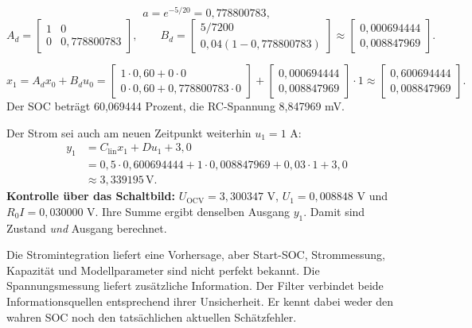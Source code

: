 \[
a=e^{-5/20}=0{,}778800783,
\]
\[
A_d=\begin{bmatrix}1&0\\0&0{,}778800783\end{bmatrix},\qquad
B_d=\begin{bmatrix}5/7200\\0{,}04(1-0{,}778800783)\end{bmatrix}
\approx\begin{bmatrix}0{,}000694444\\0{,}008847969\end{bmatrix}.
\]

\[
x_1=A_dx_0+B_du_0
=\begin{bmatrix}1\cdot0{,}60+0\cdot0\\0\cdot0{,}60+0{,}778800783\cdot0\end{bmatrix}
+\begin{bmatrix}0{,}000694444\\0{,}008847969\end{bmatrix}\cdot1
\approx\boxed{\begin{bmatrix}0{,}600694444\\0{,}008847969\end{bmatrix}}.
\]
Der SOC beträgt 60,069444 Prozent, die RC-Spannung 8,847969 mV.

Der Strom sei auch am neuen Zeitpunkt weiterhin $u_1=1$ A:
\[
\begin{aligned}
y_1&=C_{\mathrm{lin}}x_1+Du_1+3{,}0\\
&=0{,}5\cdot0{,}600694444+1\cdot0{,}008847969+0{,}03\cdot1+3{,}0\\
&\approx\boxed{3{,}339195\,\mathrm V}.
\end{aligned}
\]
\textbf{Kontrolle über das Schaltbild:} $U_{\mathrm{OCV}}=3{,}300347$ V, $U_1=0{,}008848$ V und $R_0I=0{,}030000$ V. Ihre Summe ergibt denselben Ausgang $y_1$. Damit sind Zustand \emph{und} Ausgang berechnet.

Die Stromintegration liefert eine Vorhersage, aber Start-SOC, Strommessung, Kapazität und Modellparameter sind nicht perfekt bekannt. Die Spannungsmessung liefert zusätzliche Information. Der Filter verbindet beide Informationsquellen entsprechend ihrer Unsicherheit. Er kennt dabei weder den wahren SOC noch den tatsächlichen aktuellen Schätzfehler.


